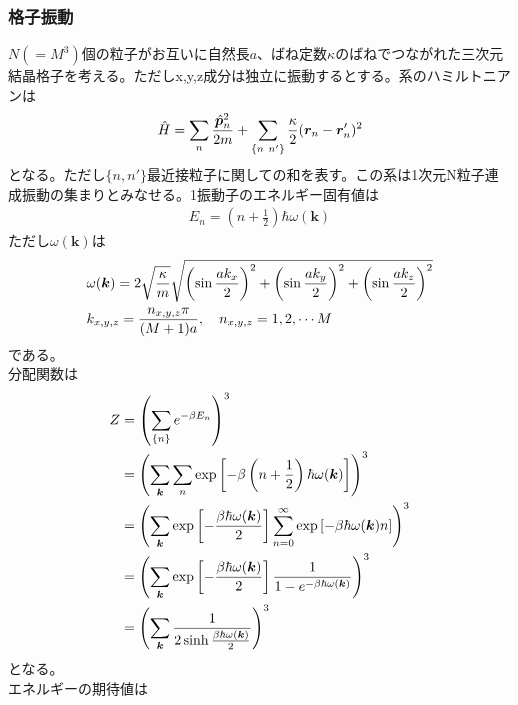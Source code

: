 \documentclass[dvipdfmx, 11pt, a4paper]{jsarticle}
\theoremstyle{definition}
\begin{document}
\subsubsection{格子振動}
    $N(=M^3)$個の粒子がお互いに自然長$a$、ばね定数$\kappa$のばねでつながれた三次元結晶格子を考える。ただしx,y,z成分は独立に振動するとする。系のハミルトニアンは
    \begin{align}
        \hat{H} = \sum_n \frac{\hat{\bm{p}}_n^2}{2m} + \sum_{\{ n\ n' \}} \frac{\kappa}{2} (\bm{r}_n -\bm{r}_n')^2 \notag 
    \end{align}
    となる。ただし$\{ n,n' \}$最近接粒子に関しての和を表す。この系は1次元N粒子連成振動の集まりとみなせる。1振動子のエネルギー固有値は
    \begin{align}
        E_n = \left( n + \frac{1}{2} \right)\hbar \omega(\bm{k})
    \end{align}
    ただし$\omega (\bm{k})$は
    \begin{align}
        &\omega (\bm{k}) = 2 \sqrt{\frac{\kappa}{m}} \sqrt{\left( \sin \frac{ak_x}{2} \right)^2 + \left( \sin \frac{ak_y}{2} \right)^2 + \left( \sin \frac{ak_z}{2} \right)^2} \\
        &k_{x,y,z} = \frac{n_{x,y,z}\pi}{(M+1)a},\quad n_{x,y,z} = 1,2,\cdots M \notag 
    \end{align}
    である。\\
    分配関数は
    \begin{align}
        Z &= \left( \sum_{\{n\}} e^{-\beta E_n} \right)^{3} \notag \\
        &= \left( \sum_{\bm{k}}\sum_n \exp\left[ {-\beta \left( n + \frac{1}{2} \right)\hbar \omega(\bm{k})} \right] \right)^{3} \notag \\
        &= \left( \sum_{\bm{k}} \exp\left[ -\frac{\beta \hbar \omega(\bm{k})}{2} \right]  \sum_{n=0}^{\infty} \exp\left[ {-\beta \hbar \omega(\bm{k})} n\right] \right)^{3} \notag \\
        &= \left( \sum_{\bm{k}} \exp\left[ -\frac{\beta \hbar \omega(\bm{k})}{2} \right]  \frac{1}{1 - e^{-\beta \hbar \omega (\bm{k})}}\right)^{3} \notag \\
        &= \left( \sum_{\bm{k}} \frac{1}{2 \sinh \frac{\beta \hbar \omega (\bm{k})}{2}}\right)^{3} 
    \end{align}
    となる。\\
    エネルギーの期待値は
\end{document}
